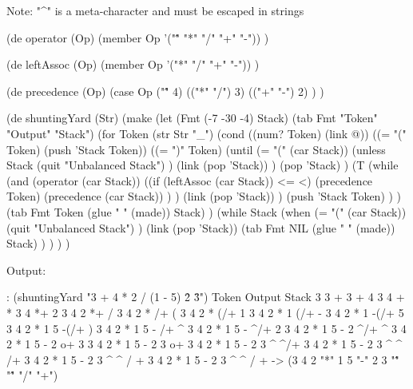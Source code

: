\begin{wideverbatim}

Note: "^" is a meta-character and must be escaped in strings

(de operator (Op)
   (member Op '("\^" "*" "/" "+" "-")) )

(de leftAssoc (Op)
   (member Op '("*" "/" "+" "-")) )

(de precedence (Op)
   (case Op
      ("\^" 4)
      (("*" "/") 3)
      (("+" "-") 2) ) )

(de shuntingYard (Str)
   (make
      (let (Fmt (-7 -30 -4)  Stack)
         (tab Fmt "Token" "Output" "Stack")
         (for Token (str Str "_")
            (cond
               ((num? Token) (link @))
               ((= "(" Token) (push 'Stack Token))
               ((= ")" Token)
                  (until (= "(" (car Stack))
                     (unless Stack
                        (quit "Unbalanced Stack") )
                     (link (pop 'Stack)) )
                  (pop 'Stack) )
               (T
                  (while
                     (and
                        (operator (car Stack))
                        ((if (leftAssoc (car Stack)) <= <)
                           (precedence Token)
                           (precedence (car Stack)) ) )
                     (link (pop 'Stack)) )
                  (push 'Stack Token) ) )
            (tab Fmt Token (glue " " (made)) Stack) )
         (while Stack
            (when (= "(" (car Stack))
               (quit "Unbalanced Stack") )
            (link (pop 'Stack))
            (tab Fmt NIL (glue " " (made)) Stack) ) ) ) )

\end{wideverbatim}

\begin{wideverbatim}

Output:

: (shuntingYard "3 + 4 * 2 / (1 - 5) \^ 2 \^ 3")
Token  Output                        Stack
3      3
+      3                             +
4      3 4                           +
*      3 4                           *+
2      3 4 2                         *+
/      3 4 2 *                       /+
(      3 4 2 *                       (/+
1      3 4 2 * 1                     (/+
-      3 4 2 * 1                     -(/+
5      3 4 2 * 1 5                   -(/+
)      3 4 2 * 1 5 -                 /+
^      3 4 2 * 1 5 -                 ^/+
2      3 4 2 * 1 5 - 2               ^/+
^      3 4 2 * 1 5 - 2               ^^/+
3      3 4 2 * 1 5 - 2 3             ^^/+
       3 4 2 * 1 5 - 2 3 ^           ^/+
       3 4 2 * 1 5 - 2 3 ^ ^         /+
       3 4 2 * 1 5 - 2 3 ^ ^ /       +
       3 4 2 * 1 5 - 2 3 ^ ^ / +
-> (3 4 2 "*" 1 5 "-" 2 3 "\^" "\^" "/" "+")

\end{wideverbatim}

